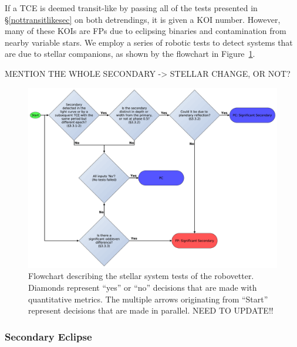 If a TCE is deemed transit-like by passing all of the tests presented in \S\ref{nottransitlikesec} on both detrendings, it is given a KOI number. However, many of these KOIs are FPs due to eclipsing binaries and contamination from nearby variable stars. We employ a series of robotic tests to detect systems that are due to stellar companions, as shown by the flowchart in Figure~\ref{robovetter-sigsec-fig}.



MENTION THE WHOLE SECONDARY -> STELLAR CHANGE, OR NOT?




\begin{figure}[ht]
\centering
\includegraphics[width=\linewidth]{RoboVetter-Diagram-V3-SigSec.pdf}
\caption{Flowchart describing the stellar system tests of the robovetter. Diamonds represent ``yes'' or ``no'' decisions that are made with quantitative metrics. The multiple arrows originating from ``Start'' represent decisions that are made in parallel. NEED TO UPDATE!!}
\label{robovetter-sigsec-fig}
\end{figure}


\subsubsection{Secondary Eclipse}

